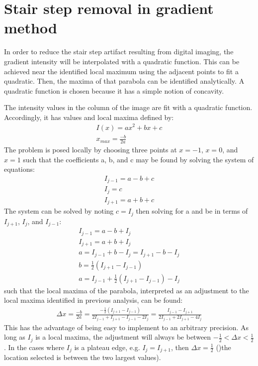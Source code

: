 \section{Stair step removal in gradient method} \label{sec:supersample}
%
In order to reduce the stair step artifact resulting from digital imaging, the gradient intensity will be interpolated with a quadratic function.
This can be achieved near the identified local maximum using the adjacent points to fit a quadratic.
Then, the maxima of that parabola can be identified analytically.
A quadratic function is chosen because it has a simple notion of concavity.
\par
The intensity values in the column of the image are fit with a quadratic function.
Accordingly, it has values and local maxima defined by:
%
\begin{gather}
I(x) = ax^2 + bx + c \\
x_{max} = \frac{-b}{2 a}
\end{gather}
%
The problem is posed locally by choosing three points at $x=-1$, $x=0$, and $x=1$ such that the coefficients a, b, and c may be found by solving the system of equations:
%
\begin{gather}
I_{j-1} = a - b + c \\
I_{j} = c \\
I_{j+1} = a + b + c
\end{gather}
%
The system can be solved by noting $c=I_j$ then solving for a and be in terms of $I_{j+1}$, $I_{j}$, and $I_{j-1}$:
%
\begin{gather}
I_{j-1} = a - b + I_{j} \\
I_{j+1} = a + b + I_{j} \\
a = I_{j-1} + b - I_{j} = I_{j+1} - b - I_{j} \\
b = \frac{1}{2} \left( I_{j+1} - I_{j-1} \right) \\
a = I_{j-1} + \frac{1}{2} \left( I_{j+1} - I_{j-1} \right) - I_{j}
\end{gather}
%
such that the local maxima of the parabola, interpreted as an adjustment to the local maxima identified in previous analysis, can be found:
%
\begin{gather}
\Delta x = \frac{-b}{2 a} = \frac{- \frac{1}{2} \left( I_{j+1} - I_{j-1} \right)}{2 I_{j-1} + I_{j+1} - I_{j-1} - 2 I_{j}} = \frac{I_{j-1} - I_{j+1}}{2 I_{j-1} + 2 I_{j+1} - 4 I_{j}}
\end{gather}
%
This has the advantage of being easy to implement to an arbitrary precision.
As long as $I_j$ is a local maxima, the adjustment will always be between $-\frac{1}{2} < \Delta x < \frac{1}{2}$.
In the cases where $I_j$ is a plateau edge, e.g. $I_j = I_{j+1}$, then $\Delta x = \frac{1}{2}$ ()the location selected is between the two largest values).